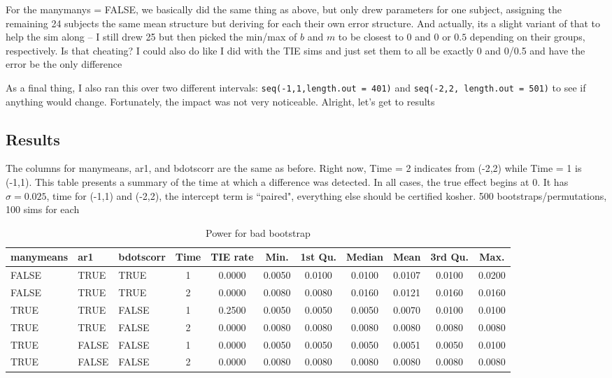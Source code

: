 \documentclass{article}
\newcommand{\xt}{\texttt}
\begin{document}
For the manymanys = FALSE, we basically did the same thing as above, but only drew parameters for one subject, assigning the remaining 24 subjects the same mean structure but deriving for each their own error structure. And actually, its a slight variant of that to help the sim along -- I still drew 25 but then picked the min/max of $b$ and $m$ to be closest to $0$ and $0$ or $0.5$ depending on their groups, respectively. Is that cheating? I could also do like I did with the TIE sims and just set them to all be exactly 0 and 0/0.5 and have the error be the only difference

As a final thing, I also ran this over two different intervals: \xt{seq(-1,1,length.out = 401)} and \xt{seq(-2,2, length.out = 501)} to see if anything would change. Fortunately, the impact was not very noticeable. Alright, let's get to results

\subsection{Results}

The columns for manymeans, ar1, and bdotscorr are the same as before. Right now, Time = 2 indicates from (-2,2) while Time = 1 is (-1,1). This table presents a summary of the time at which a difference was detected. In all cases, the true effect begins at 0. It has $\sigma = 0.025$, time for (-1,1) and (-2,2), the intercept term is ``paired", everything else should be certified kosher. 500 bootstraps/permutations, 100 sims for each

\begin{table}[H]
\centering
\begin{tabular}{lllcccccccc}
  \hline
manymeans & ar1 & bdotscorr & Time & TIE rate & Min. & 1st Qu. & Median & Mean & 3rd Qu. & Max. \\ 
  \hline
FALSE & TRUE & TRUE &     1 & 0.0000 & 0.0050 & 0.0100 & 0.0100 & 0.0107 & 0.0100 & 0.0200 \\ 
  FALSE & TRUE & TRUE &     2 & 0.0000 & 0.0080 & 0.0080 & 0.0160 & 0.0121 & 0.0160 & 0.0160 \\ 
  TRUE & TRUE & FALSE &     1 & 0.2500 & 0.0050 & 0.0050 & 0.0050 & 0.0070 & 0.0100 & 0.0100 \\ 
  TRUE & TRUE & FALSE &     2 & 0.0000 & 0.0080 & 0.0080 & 0.0080 & 0.0080 & 0.0080 & 0.0080 \\ 
  TRUE & FALSE & FALSE &     1 & 0.0000 & 0.0050 & 0.0050 & 0.0050 & 0.0051 & 0.0050 & 0.0100 \\ 
  TRUE & FALSE & FALSE &     2 & 0.0000 & 0.0080 & 0.0080 & 0.0080 & 0.0080 & 0.0080 & 0.0080 \\ 
   \hline
\end{tabular}
\caption{Power for bad bootstrap} 
\label{tab:bad_boot_pwr}
\end{table}
\end{document}
